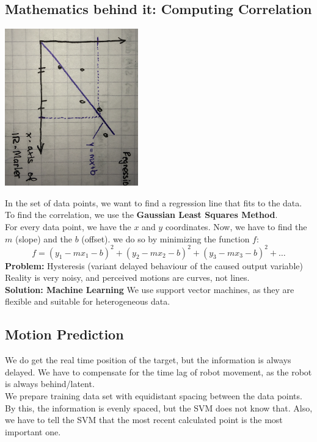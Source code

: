 \documentclass{exerciseBlue}
\begin{document}
\subsection{Mathematics behind it: Computing Correlation}
\begin{center}
	\includegraphics[height = 6.8cm]{Images/Regression}
\end{center}
In the set of data points, we want to find a regression line that fits to the data. To find the correlation, we use the \textbf{Gaussian Least Squares Method}.\\
For every data point, we have the $x$ and $y$ coordinates. Now, we have to find the $m$ (slope) and the $b$ (offset). we do so by minimizing the function $f$:
$$f = (y_1-mx_1-b)^2+(y_2-mx_2-b)^2+(y_3-mx_3-b)^2+\dots$$
\textbf{Problem:} Hysteresis (variant delayed behaviour of the caused output variable)\\
Reality is very noisy, and perceived motions are curves, not lines.\\
\textbf{Solution: Machine Learning}
We use support vector machines, as they are flexible and suitable for heterogeneous data.
\subsection{Motion Prediction}
We do get the real time position of the target, but the information is always delayed. We have to compensate for the time lag of robot movement, as the robot is always behind/latent.\\
We prepare training data set with equidistant spacing between the data points. By this, the information is evenly spaced, but the SVM does not know that. Also, we have to tell the SVM that the most recent calculated point is the most important one.
\newpage
\end{document}
